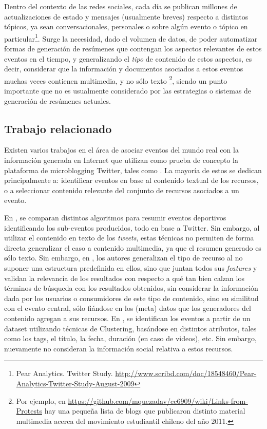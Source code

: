 \documentclass[11pt,letterpaper]{article}
\begin{document}
   Dentro del contexto de las redes sociales, cada día se publican
   millones de actualizaciones de estado y mensajes (usualmente
   breves) respecto a distintos tópicos, ya sean conversacionales,
   personales o sobre algún evento o tópico en particular\footnote{Pear
   Analytics. Twitter
   Study. \href{http://www.scribd.com/doc/18548460/Pear-Analytics-Twitter-Study-August-2009}{http://www.scribd.com/doc/18548460/Pear-Analytics-Twitter-Study-August-2009} }. 
   Surge la necesidad, dado el volumen de datos, de poder automatizar
   formas de generación de resúmenes que contengan los aspectos
   relevantes de estos eventos en el tiempo, y generalizando el \emph{tipo}
   de contenido de estos aspectos, es decir, considerar que la
   información y documentos asociados a estos eventos muchas veces
   contienen multimedia, y no sólo 
   texto \footnote{Por ejemplo, en
   \href{https://github.com/mquezadav/cc6909/wiki/Links-from-Protests}{https://github.com/mquezadav/cc6909/wiki/Links-from-Protests} 
   hay una pequeña lista de blogs que publicaron distinto material
   multimedia acerca del movimiento estudiantil chileno del año 2011. }, 
   siendo un punto importante que no es usualmente considerado
   por las estrategias o sistemas de generación de resúmenes actuales.

\subsection{Trabajo relacionado}
\label{sec-1.2}


   Existen varios trabajos en el área de asociar eventos del mundo real
   con la información generada en Internet que utilizan como prueba de
   concepto la plataforma de microblogging Twitter, tales como
   \cite{events, real, microblogs, earthquakes}. La mayoría de estos
   se dedican principalmente a:  identificar eventos en base al
   contenido textual de los recursos, o a seleccionar contenido
   relevante del conjunto de recursos asociados a un evento. 


   En \cite{events}, se comparan distintos algoritmos para
   resumir eventos deportivos identificando los sub-eventos producidos,
   todo en base a Twitter. Sin embargo, al utilizar el contenido en
   texto de los \emph{tweets}, estas técnicas no permiten de forma directa
   generalizar el caso a contenido multimedia, ya que el resumen generado
   es sólo texto. Sin embargo, en \cite{concerts}, los autores
   generalizan el tipo de recurso al no suponer una estructura
   predefinida en ellos, sino que juntan todos sus \emph{features} y validan
   la relevancia de los resultados con respecto a qué tan bien calzan los
   términos de búsqueda con los resultados obtenidos, sin considerar la
   información dada por los usuarios o consumidores de este tipo de
   contenido, sino su similitud con el evento central, sólo fiándose en
   los (meta) datos que los generadores del contenido agregan a sus
   recursos. En \cite{clusterers}, se identifican los eventos a partir de
   un dataset utilizando técnicas de Clustering, basándose en distintos
   atributos, tales como los tags, el título, la fecha, duración (en caso
   de videos), etc. Sin embargo, nuevamente no consideran la información 
   social relativa a estos recursos.
\end{document}
